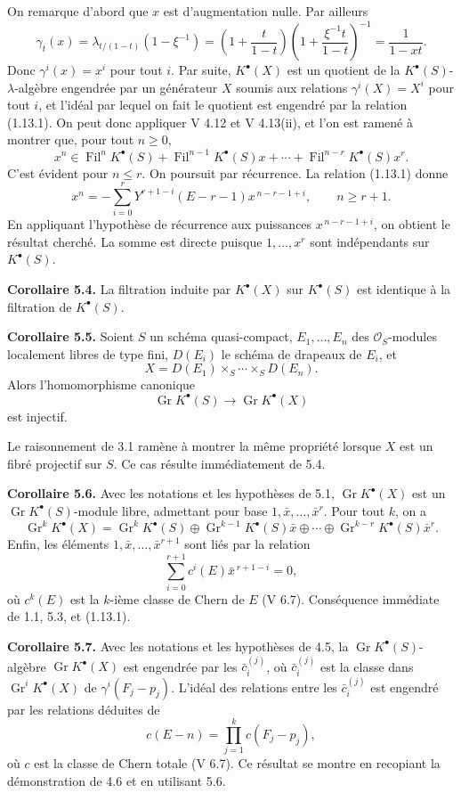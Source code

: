 \documentclass[11pt]{article}
\newcommand{\Fil}{\operatorname{Fil}}
\begin{document}
On remarque d'abord que \(x\) est d'augmentation nulle. Par ailleurs
\[
  \gamma_t(x)=
  \lambda_{t/(1-t)}(1-\xi^{-1})
  =
  \left(1+\frac{t}{1-t}\right)\left(1+\frac{\xi^{-1}t}{1-t}\right)^{-1}
  =
  \frac{1}{1-xt}.
\]
Donc \(\gamma^i(x)=x^i\) pour tout \(i\). Par suite, \(K^\bullet(X)\) est un quotient de la \(K^\bullet(S)\)-\(\lambda\)-algèbre engendrée par un générateur \(X\) soumis aux relations \(\gamma^i(X)=X^i\) pour tout \(i\), et l'idéal par lequel on fait le quotient est engendré par la relation (1.13.1). On peut donc appliquer V 4.12 et V 4.13(ii), et l'on est ramené à montrer que, pour tout \(n\geq0\),
\[
  x^n\in \Fil^nK^\bullet(S)+\Fil^{n-1}K^\bullet(S)x+\cdots+
  \Fil^{n-r}K^\bullet(S)x^r.
\]
C'est évident pour \(n\leq r\). On poursuit par récurrence. La relation (1.13.1) donne
\[
  x^n=-\sum_{i=0}^{r}Y^{r+1-i}(E-r-1)x^{\,n-r-1+i},\qquad n\geq r+1.
\]
En appliquant l'hypothèse de récurrence aux puissances \(x^{\,n-r-1+i}\), on obtient le résultat cherché. La somme est directe puisque \(1,\ldots,x^r\) sont indépendants sur \(K^\bullet(S)\).

\textbf{Corollaire 5.4.} La filtration induite par \(K^\bullet(X)\) sur \(K^\bullet(S)\) est identique à la filtration de \(K^\bullet(S)\).

\textbf{Corollaire 5.5.} Soient \(S\) un schéma quasi-compact, \(E_1,\ldots,E_n\) des \(\mathcal O_S\)-modules localement libres de type fini, \(D(E_i)\) le schéma de drapeaux de \(E_i\), et
\[
  X=D(E_1)\times_S\cdots\times_S D(E_n).
\]
Alors l'homomorphisme canonique
\[
  \operatorname{Gr}K^\bullet(S)\longrightarrow\operatorname{Gr}K^\bullet(X)
\]
est injectif.

Le raisonnement de 3.1 ramène à montrer la même propriété lorsque \(X\) est un fibré projectif sur \(S\). Ce cas résulte immédiatement de 5.4.

\textbf{Corollaire 5.6.} Avec les notations et les hypothèses de 5.1, \(\operatorname{Gr}K^\bullet(X)\) est un \(\operatorname{Gr}K^\bullet(S)\)-module libre, admettant pour base \(1,\bar x,\ldots,\bar x^r\). Pour tout \(k\), on a
\[
  \operatorname{Gr}^kK^\bullet(X)=
  \operatorname{Gr}^kK^\bullet(S)\oplus
  \operatorname{Gr}^{k-1}K^\bullet(S)\bar x\oplus\cdots\oplus
  \operatorname{Gr}^{k-r}K^\bullet(S)\bar x^r.
\]
Enfin, les éléments \(1,\bar x,\ldots,\bar x^{r+1}\) sont liés par la relation
\[
  \sum_{i=0}^{r+1}c^i(E)\bar x^{\,r+1-i}=0,
\]
où \(c^k(E)\) est la \(k\)-ième classe de Chern de \(E\) (V 6.7). Conséquence immédiate de 1.1, 5.3, et (1.13.1).

\textbf{Corollaire 5.7.} Avec les notations et les hypothèses de 4.5, la \(\operatorname{Gr}K^\bullet(S)\)-algèbre \(\operatorname{Gr}K^\bullet(X)\) est engendrée par les \(\bar c_i^{(j)}\), où \(\bar c_i^{(j)}\) est la classe dans \(\operatorname{Gr}^iK^\bullet(X)\) de \(\gamma^i(F_j-p_j)\). L'idéal des relations entre les \(\bar c_i^{(j)}\) est engendré par les relations déduites de
\[
  c(E-n)=\prod_{j=1}^{k}c(F_j-p_j),
\]
où \(c\) est la classe de Chern totale (V 6.7). Ce résultat se montre en recopiant la démonstration de 4.6 et en utilisant 5.6.
\end{document}
